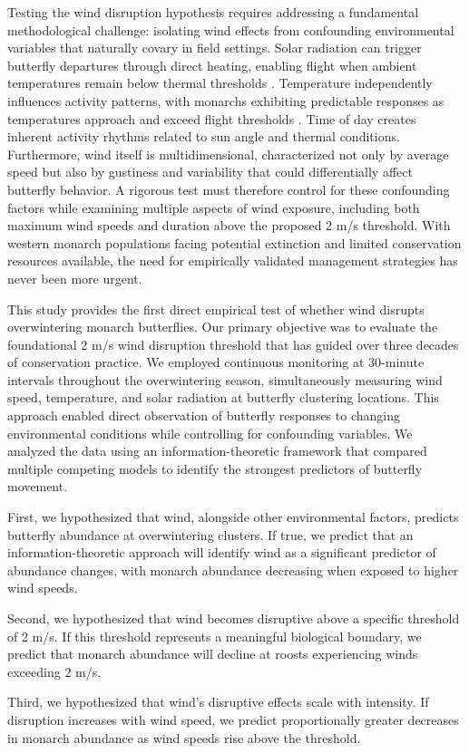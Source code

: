 Testing the wind disruption hypothesis requires addressing a fundamental methodological challenge: isolating wind effects from confounding environmental variables that naturally covary in field settings. Solar radiation can trigger butterfly departures through direct heating, enabling flight when ambient temperatures remain below thermal thresholds \citep{mastersThermoregulatoryBehaviorAdaptations1988}. Temperature independently influences activity patterns, with monarchs exhibiting predictable responses as temperatures approach and exceed flight thresholds \citep{barkerEffectPhotoperiodTemperature1976}. Time of day creates inherent activity rhythms related to sun angle and thermal conditions. Furthermore, wind itself is multidimensional, characterized not only by average speed but also by gustiness and variability \citep{nathanLongdistanceBiologicalTransport2005} that could differentially affect butterfly behavior. A rigorous test must therefore control for these confounding factors while examining multiple aspects of wind exposure, including both maximum wind speeds and duration above the proposed 2 m/s threshold. With western monarch populations facing potential extinction and limited conservation resources available, the need for empirically validated management strategies has never been more urgent.

This study provides the first direct empirical test of whether wind disrupts overwintering monarch butterflies. Our primary objective was to evaluate the foundational 2 m/s wind disruption threshold that has guided over three decades of conservation practice. We employed continuous monitoring at 30-minute intervals throughout the overwintering season, simultaneously measuring wind speed, temperature, and solar radiation at butterfly clustering locations. This approach enabled direct observation of butterfly responses to changing environmental conditions while controlling for confounding variables. We analyzed the data using an information-theoretic framework that compared multiple competing models to identify the strongest predictors of butterfly movement.

First, we hypothesized that wind, alongside other environmental factors, predicts butterfly abundance at overwintering clusters. If true, we predict that an information-theoretic approach will identify wind as a significant predictor of abundance changes, with monarch abundance decreasing when exposed to higher wind speeds.

Second, we hypothesized that wind becomes disruptive above a specific threshold of 2 m/s. If this threshold represents a meaningful biological boundary, we predict that monarch abundance will decline at roosts experiencing winds exceeding 2 m/s.

Third, we hypothesized that wind’s disruptive effects scale with intensity. If disruption increases with wind speed, we predict proportionally greater decreases in monarch abundance as wind speeds rise above the threshold.